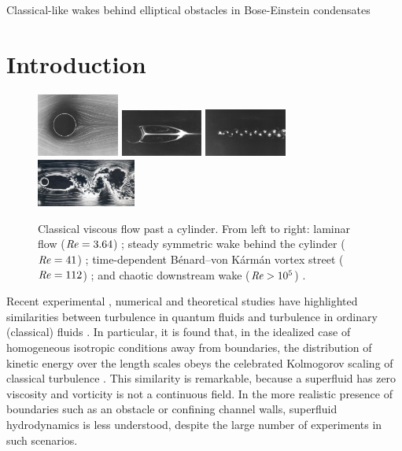 \begin{chapter}{\label{cha:wake}Classical-like wakes behind elliptical obstacles in Bose-Einstein condensates}

\section{Introduction}
\begin{figure}[!ht]
\centering
  \includegraphics[height=2.08cm,angle=180]{wake/3.png}
  \includegraphics[width=0.24\textwidth,angle=180]{wake/taneda41}
  \includegraphics[width=0.24\textwidth,angle=180]{wake/taneda112}
    \includegraphics[width=0.29\textwidth,angle=180]{wake/turb.jpg}
  \caption{Classical viscous flow past a cylinder. From left to right: laminar flow ($\mbox{\ensuremath{\mathit{Re}}}=3.64$) \cite{taneda41}; steady symmetric wake behind the cylinder ($\mbox{\ensuremath{\mathit{Re}}}=41$) \cite{taneda41}; time-dependent B\'enard--von K\'arm\'an vortex street ($\mbox{\ensuremath{\mathit{Re}}} = 112$) \cite{taneda112}; and chaotic downstream wake ($\mbox{\ensuremath{\mathit{Re}}} > 10^5$) \cite{nagib}.} 
  \label{fig:taneda-imgs}
\end{figure}
Recent experimental \cite{Tabeling,Salort}, 
numerical \cite{Nore,Kobayashi,Laurie} 
and theoretical studies \cite{Lvov}
have highlighted similarities between turbulence in quantum
fluids and turbulence in ordinary (classical) fluids \cite{Frisch}.
In particular, it is found that, in
the idealized case of homogeneous isotropic conditions away from
boundaries, the distribution of kinetic energy over the 
length scales obeys the celebrated Kolmogorov scaling of 
classical turbulence \cite{barenghi}. This similarity is remarkable,
because a superfluid has zero viscosity and vorticity is not a continuous
field. In the more realistic presence of boundaries such as an obstacle or confining channel
walls, superfluid hydrodynamics is less understood, despite the large number of experiments in such scenarios. 


\end{chapter}
